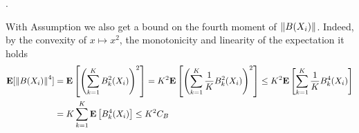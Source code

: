\begin{assumption}
  .
\end{assumption}
\begin{remark}
With Assumption we also get a bound on the fourth moment of 
  $
  \left\lVert B(X_{i})\right\rVert
  $. Indeed, by the convexity of 
  $x\mapsto x^2$, the monotonicity and linearity of the expectation it holds   
  \begin{align*}
    \begin{split}
  \mathbf{E}[
  \left\lVert B(X_{i})\right\rVert^4
  ] 
  &=
  \mathbf{E}
  \left[ 
    \left( 
      \sum_{k=1}^{K}
      B_k^2(X_i)
    \right)^2
  \right]
  =
  K^2
  \mathbf{E}
  \left[ 
    \left( 
      \sum_{k=1}^{K}
      \frac{1}{K}
      B_k^2(X_i)
    \right)^2
  \right]
  \le
  K^2
  \mathbf{E}
  \left[ 
      \sum_{k=1}^{K}
      \frac{1}{K}
      B_k^4(X_i)
  \right]
  \\
  &=
  K
  \sum_{k=1}^{K}
  \mathbf{E}
  \left[ 
      B_k^4(X_i)
  \right]
  \le
  K^2 C_B
  \end{split}
  \end{align*}
\end{remark}
